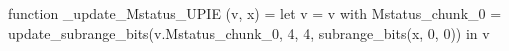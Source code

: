 function _update_Mstatus_UPIE (v, x) = let v = { v with Mstatus_chunk_0 = update_subrange_bits(v.Mstatus_chunk_0, 4, 4, subrange_bits(x, 0, 0)) } in
  v
